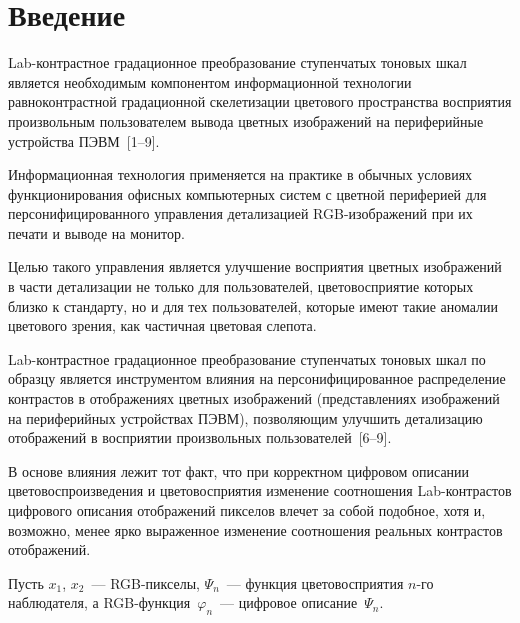 


      \thispagestyle{headings}

      \begin{multicols}{2}

            \label{st\stat}

\section{Введение}
  
  Lab-контрастное градационное преобразование ступенчатых тоновых шкал 
является необходимым компонентом информационной технологии 
равноконт\-растной градационной скелетизации цветового пространства 
восприятия произвольным пользователем вывода цветных изображений на 
периферийные устройства ПЭВМ~[1--9]. 
  
  Информационная технология применяется на практике в обычных условиях 
функционирования офисных компьютерных систем с цветной периферией для 
персонифицированного управления детализацией RGB-изоб\-ра\-же\-ний при 
их печати и выводе на монитор. 
  
  Целью такого управления является улучшение восприятия цветных 
изображений в части детализации не только для пользователей, 
цветовосприятие которых близко к стандарту, но и для тех пользователей, 
которые имеют такие аномалии цветового зрения, как частичная цветовая 
слепота. 
  
  Lab-контрастное градационное преобразование ступенчатых тоновых шкал 
по образцу является инструментом влияния на персонифицированное 
распределение контрастов в отображениях цветных изображений 
(представлениях изображений на периферийных устройствах ПЭВМ), 
позволяющим улучшить детализацию отображений в восприятии 
произвольных пользователей~[6--9]. 
  
  В основе влияния лежит тот факт, что при корректном цифровом описании 
цветовоспроизведения и цветовосприятия изменение соотношения 
  Lab-конт\-рас\-тов цифрового описания отображений пикселов влечет за 
собой подобное, хотя и, возможно, менее ярко выраженное изменение 
соотношения реальных контрастов отображений.
  
  Пусть $x_1$, $x_2$~--- RGB-пик\-се\-лы, $\Psi_n$~--- функция 
цветовосприятия $n$-го наблюдателя, а RGB-функ\-ция~$\varphi_n$~--- 
цифровое описание~$\Psi_n$. 
  

\end{multicols}
